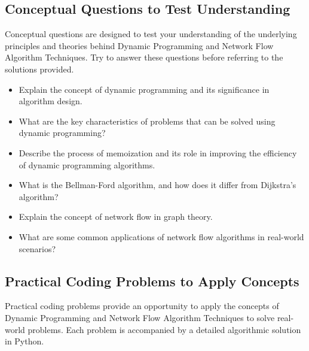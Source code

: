 \documentclass[12pt]{book} %
\begin{document}
\subsection{Conceptual Questions to Test Understanding}
Conceptual questions are designed to test your understanding of the underlying principles and theories behind Dynamic Programming and Network Flow Algorithm Techniques. Try to answer these questions before referring to the solutions provided.

\begin{itemize}
    \item Explain the concept of dynamic programming and its significance in algorithm design.
    \item What are the key characteristics of problems that can be solved using dynamic programming?
    \item Describe the process of memoization and its role in improving the efficiency of dynamic programming algorithms.
    \item What is the Bellman-Ford algorithm, and how does it differ from Dijkstra's algorithm?
    \item Explain the concept of network flow in graph theory.
    \item What are some common applications of network flow algorithms in real-world scenarios?
\end{itemize}

\subsection{Practical Coding Problems to Apply Concepts}
Practical coding problems provide an opportunity to apply the concepts of Dynamic Programming and Network Flow Algorithm Techniques to solve real-world problems. Each problem is accompanied by a detailed algorithmic solution in Python.
\end{document}
